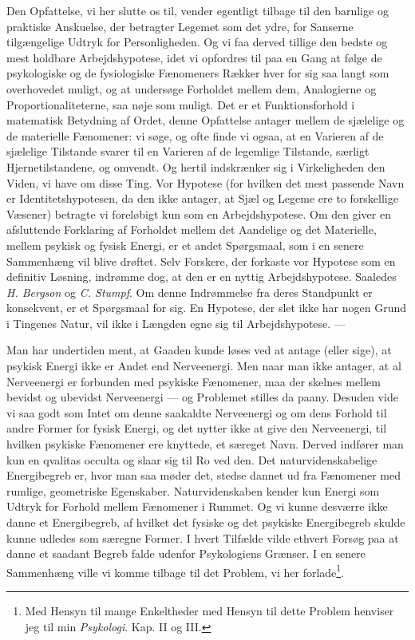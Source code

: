 \documentclass[12pt,a4paper]{book}
\newcommand{\opage}[1]{\marginnote{\footnotesize\textit{[#1]}}}
\newcommand{\apage}[1]{\marginnote{\footnotesize\textit{[#1]}}}
\begin{document}
Den Opfattelse, vi her slutte os til, vender egentligt tilbage til den
barnlige og praktiske Anskuelse, der betragter Legemet som det ydre,
for Sanserne tilgængelige Udtryk for Personligheden. Og vi faa derved
tillige den bedste og mest holdbare Arbejdshypotese, idet vi opfordres
til paa en Gang at følge de psykologiske og de fysiologiske
Fænomeners Rækker hver for sig saa langt som overhovedet muligt, og at
undersøge Forholdet mellem dem, Analogierne og Proportionaliteterne,
saa nøje som muligt. Det er et Funktionsforhold i matematisk Betydning
af Ordet, denne Opfattelse antager mellem de sjælelige og de materielle Fænomener: \apage{33} vi søge, og ofte finde vi ogsaa, at en Varieren af de
sjælelige Tilstande svarer til en Varieren af de legemlige Tilstande,
særligt Hjernetilstandene, og omvendt. Og hertil indskrænker sig i
Virkeligheden den Viden, vi have om disse Ting. Vor Hypotese (for
hvilken det mest passende Navn er Identitetshypotesen, da den ikke
antager, at Sjæl og Legeme ere to forskellige Væsener) betragte vi
foreløbigt kun som en Arbejdshypotese. Om den giver en afsluttende
Forklaring af Forholdet mellem det Aandelige og det Materielle, mellem
psykisk og fysisk Energi, er et andet Spørgsmaal, som i en senere
Sammenhæng vil blive drøftet. Selv Forskere, der forkaste vor Hypotese
som en definitiv Løsning, indrømme dog, at den er en nyttig
Arbejdshypotese. Saaledes \emph{H. Bergson} og \emph{C. Stumpf}. Om
denne Indrømmelse fra deres Standpunkt er konsekvent, er et Spørgsmaal
for sig. En Hypotese, der slet ikke har nogen Grund i Tingenes Natur,
vil ikke i Længden egne sig til Arbejdshypotese. ---

Man har undertiden ment, at Gaaden kunde løses ved at antage (eller
sige), at psykisk Energi ikke er Andet end Nerveenergi. Men naar man
ikke antager, at al Nerveenergi er forbunden med psykiske Fænomener,
maa der skelnes mellem bevidst og ubevidst Nerveenergi --- og
Problemet stilles da paany. Desuden vide vi saa godt som Intet om denne
saakaldte Nerveenergi og om dens Forhold til andre Former for fysisk
Energi, og det nytter ikke at give den Nerveenergi, til hvilken
psykiske Fænomener ere knyttede, et særeget Navn. Derved indfører man
kun en qvalitas occulta og slaar sig til Ro ved den. Det
naturvidenskabelige Energibegreb er, hvor man saa møder det, stedse
dannet ud fra Fænomener med rumlige, geometriske Egenskaber.
Naturvidenskaben kender kun Energi som Udtryk for Forhold mellem
Fænomener i Rummet. Og vi kunne desværre ikke danne et Energibegreb,
af hvilket det fysiske og det psykiske Energibegreb skulde kunne
udledes som særegne Former. I hvert Tilfælde vilde ethvert Forsøg paa
at danne et saadant Begreb falde udenfor Psykologiens Græn\opage{34}ser. I en
senere Sammenhæng ville vi komme tilbage til det Problem, vi her
forlade\footnote{Med Hensyn til mange Enkeltheder med Hensyn til dette
Problem henviser jeg til min \emph{Psykologi}. Kap. II og III.}.
\end{document}
